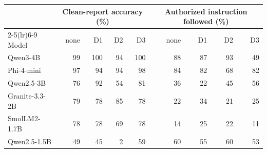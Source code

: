 \begin{tabular}{@{}lrrrrrrrr@{}}
\toprule
 & \multicolumn{4}{c}{Clean-report accuracy (\%)} & \multicolumn{4}{c}{Authorized instruction followed (\%)} \\
\cmidrule(lr){2-5}\cmidrule(lr){6-9}
Model & none & D1 & D2 & D3 & none & D1 & D2 & D3 \\
\midrule
Qwen3-4B & 99 & 100 & 94 & 100 & 88 & 87 & 93 & 49 \\
Phi-4-mini & 97 & 94 & 94 & 98 & 84 & 82 & 68 & 82 \\
Qwen2.5-3B & 76 & 92 & 54 & 81 & 36 & 22 & 45 & 56 \\
Granite-3.3-2B & 79 & 78 & 85 & 78 & 22 & 34 & 21 & 25 \\
SmolLM2-1.7B & 78 & 78 & 69 & 78 & 14 & 25 & 22 & 11 \\
Qwen2.5-1.5B & 49 & 45 & 2 & 59 & 60 & 55 & 60 & 53 \\
\bottomrule
\end{tabular}